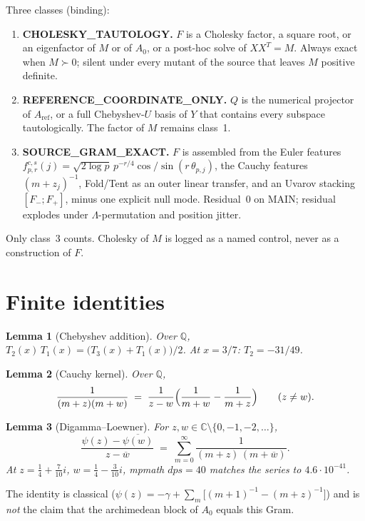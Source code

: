 \documentclass[11pt]{article}
\newtheorem{lemma}{Lemma}
\theoremstyle{remark}
\begin{document}
Three classes (binding):
\begin{enumerate}
\item \textbf{CHOLESKY\_TAUTOLOGY.}
$F$ is a Cholesky factor, a square root, or an eigenfactor of
$M$ or of $A_0$, or a post-hoc solve of $XX^T=M$.
Always exact when $M\succ 0$; silent under every mutant of the
source that leaves $M$ positive definite.
\item \textbf{REFERENCE\_COORDINATE\_ONLY.}
$Q$ is the numerical projector of $A_{\mathrm{ref}}$, or a
full Chebyshev-$U$ basis of $Y$ that contains every subspace
tautologically.
The factor of $M$ remains class~1.
\item \textbf{SOURCE\_GRAM\_EXACT.}
$F$ is assembled from the Euler features
$f^{c,s}_{p,r}(j)=\sqrt{2\log p}\,p^{-r/4}\cos/\sin(r\,\theta_{p,j})$,
the Cauchy features $(m+z_j)^{-1}$, Fold/Tent as an outer
linear transfer, and an Uvarov stacking
$[F_-;F_+]$, minus one explicit null mode.
Residual~$0$ on MAIN; residual explodes under
$\Lambda$-permutation and position jitter.
\end{enumerate}
Only class~3 counts.
Cholesky of $M$ is logged as a named control, never as a
construction of $F$.

\section{Finite identities}\label{sec:satz}

\begin{lemma}[Chebyshev addition]\label{lem:cheb}
Over $\mathbb{Q}$, $T_2(x)\,T_1(x)=\bigl(T_3(x)+T_1(x)\bigr)/2$.
At $x=3/7$: $T_2=-31/49$.
\end{lemma}

\begin{lemma}[Cauchy kernel]\label{lem:cauchy}
Over $\mathbb{Q}$,
\[
  \frac{1}{(m+z)(m+w)}
  \;=\;
  \frac{1}{z-w}\Bigl(\frac{1}{m+w}-\frac{1}{m+z}\Bigr)
  \qquad(z\neq w).
\]
\end{lemma}

\begin{lemma}[Digamma--Loewner]\label{lem:loewner}
For $z,w\in\mathbb{C}\setminus\{0,-1,-2,\ldots\}$,
\[
  \frac{\psi(z)-\overline{\psi(w)}}{z-\overline{w}}
  \;=\;
  \sum_{m=0}^\infty \frac{1}{(m+z)\,(m+\overline{w})}.
\]
At $z=\tfrac14+\tfrac7{10}i$, $w=\tfrac14-\tfrac3{10}i$,
mpmath $dps=40$ matches the series to $4.6\cdot 10^{-41}$.
\end{lemma}

The identity is classical
($\psi(z)=-\gamma+\sum_m\bigl[(m+1)^{-1}-(m+z)^{-1}\bigr]$)
and is \emph{not} the claim that the archimedean block of
$A_0$ equals this Gram.
\end{document}
